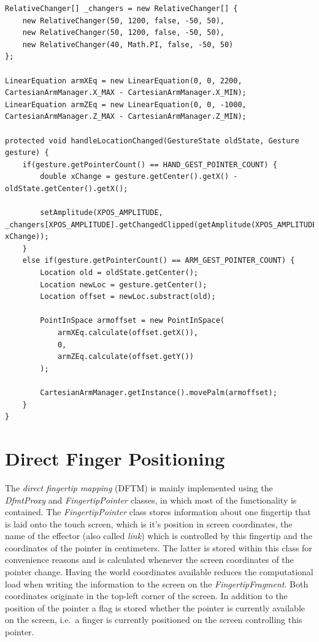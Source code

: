 \begin{lstlisting}[caption={Example usage of RelativeChanger in RelativeSynergyProxy},label=lst:impl:syn:expl]
RelativeChanger[] _changers = new RelativeChanger[] {
	new RelativeChanger(50, 1200, false, -50, 50),
	new RelativeChanger(50, 1200, false, -50, 50),
	new RelativeChanger(40, Math.PI, false, -50, 50)
};

LinearEquation armXEq = new LinearEquation(0, 0, 2200, CartesianArmManager.X_MAX - CartesianArmManager.X_MIN);
LinearEquation armZEq = new LinearEquation(0, 0, -1000, CartesianArmManager.Z_MAX - CartesianArmManager.Z_MIN);

protected void handleLocationChanged(GestureState oldState, Gesture gesture) {
	if(gesture.getPointerCount() == HAND_GEST_POINTER_COUNT) {
		double xChange = gesture.getCenter().getX() - oldState.getCenter().getX();
		
		setAmplitude(XPOS_AMPLITUDE, _changers[XPOS_AMPLITUDE].getChangedClipped(getAmplitude(XPOS_AMPLITUDE), xChange));
	}
	else if(gesture.getPointerCount() == ARM_GEST_POINTER_COUNT) {
		Location old = oldState.getCenter();
		Location newLoc = gesture.getCenter();
		Location offset = newLoc.substract(old);
		
		PointInSpace armoffset = new PointInSpace(
			armXEq.calculate(offset.getX()),
			0,
			armZEq.calculate(offset.getY())
		);
		
		CartesianArmManager.getInstance().movePalm(armoffset);
	}
}
\end{lstlisting}


\section{Direct Finger Positioning}
\label{sec:impl:dfmt}

The \textit{direct fingertip mapping} (DFTM) is mainly implemented using the \textit{DfmtProxy} and \textit{FingertipPointer} classes, in which most of the functionality is contained. The \textit{FingertipPointer} class stores information about one fingertip that is laid onto the touch screen, which is it's position in screen coordinates, the name of the effector (also called \textit{link}) which is controlled by this fingertip and the coordinates of the pointer in centimeters. The latter is stored within this class for convenience reasons and is calculated whenever the screen coordinates of the pointer change. Having the world coordinates available reduces the computational load when writing the information to the screen on the \textit{FingertipFragment}. Both coordinates originate in the top-left corner of the screen. In addition to the position of the pointer a flag is stored whether the pointer is currently available on the screen, i.e.~a finger is currently positioned on the screen controlling this pointer.


